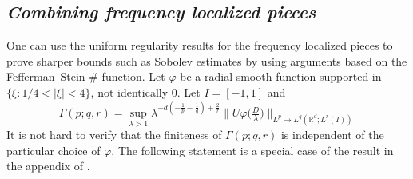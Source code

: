 \documentclass[11pt]{amsart}
\theoremstyle{definition}
\numberwithin{theorem}{section}
\numberwithin{definition}{section}
\numberwithin{equation}{section}
\newcommand{\Be}{\begin{equation}}
\newcommand{\Ee}{\end{equation}}
\newcommand{\Z}{\mathbb{Z}}
\def\la{\lambda}             \def\La{\Lambda}
\begin{document}
\subsection{\it Combining frequency localized  pieces}\label{cflp}
One can use the uniform regularity results for the frequency localized pieces
to prove sharper bounds such as  Sobolev estimates by using arguments
based on the Fefferman--Stein \#-function.
Let $\varphi$ be a radial  smooth function supported in
$\{\xi:1/4<|\xi|<4\}$, not identically $0$. Let $I=[-1,1]$ and  \Be\label{Gammadef}
\Gamma(p;q,r)=\sup_{\la>1} \la^{-d(-\frac 1p-\frac 1q)+\frac 2r} \big\|U
\varphi \big(\tfrac{D}{\la}\big)\big\|_{L^p\to L^q(\mathbb R^d;L^r(I))}
\Ee
It is not hard to verify that  the finiteness of
$\Gamma(p;q,r)$ is independent of the particular choice of $\varphi$.
The following statement is a special case of the result in the appendix of \cite{lerose}.
\end{document}
